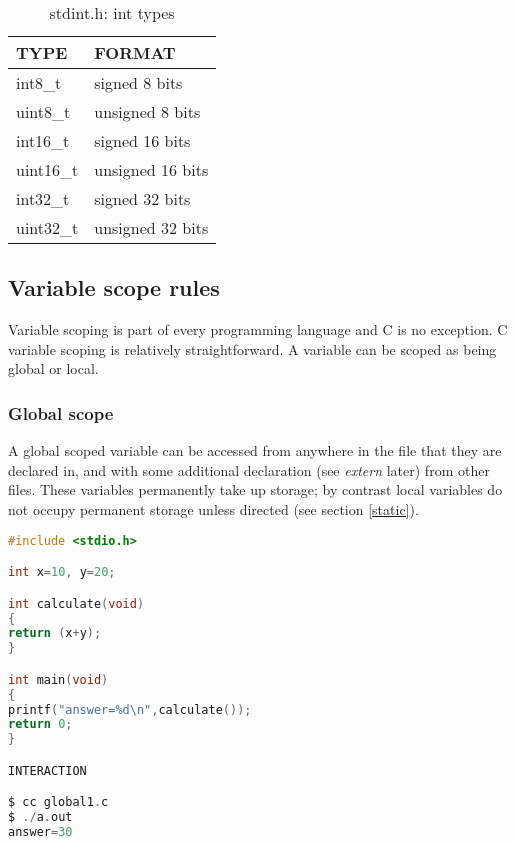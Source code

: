 \begin{table}[H]
  \centering
  \begin{tabular}{ | l | l |}
    \hline
    TYPE & FORMAT \\ \hline
    int8\_t & signed 8 bits \\ \hline
    uint8\_t & unsigned 8 bits \\ \hline
    int16\_t & signed 16 bits \\ \hline
    uint16\_t & unsigned 16 bits \\ \hline
    int32\_t & signed 32 bits \\ \hline
    uint32\_t & unsigned 32 bits \\ \hline
  \end{tabular}
  \caption{stdint.h: int types}
  \label{inttypes}
\end{table}

\subsection{Variable scope rules}

Variable scoping is part of every programming language and C is no exception. C variable scoping is relatively straightforward. A variable can be scoped as being global or local. 

\subsubsection{Global scope}


A global scoped variable can be accessed from anywhere in the file that they are declared in, and with some additional declaration (see \textit{extern} later) from other files. These variables permanently take up storage; by contrast local variables do not occupy permanent storage unless directed (see section \ref{static}).\\

\begin{lstlisting}[language=C,caption={File global1.c, block scope},captionpos=b,label=global1]
#include <stdio.h>

int x=10, y=20;

int calculate(void)
{
return (x+y);
}

int main(void)
{
printf("answer=%d\n",calculate());
return 0;
}

INTERACTION

$ cc global1.c 
$ ./a.out
answer=30
\end{lstlisting}

